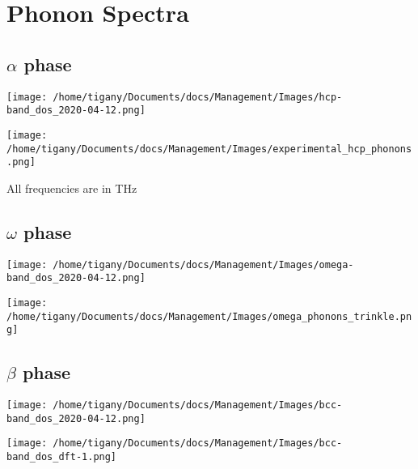 \documentclass[11pt]{article}
\begin{document}
\section*{Phonon Spectra}
\label{sec:org308d6d3}

\subsection*{\(\alpha\) phase}
\label{sec:org92876f7}
\begin{center}
\texttt{[image: /home/tigany/Documents/docs/Management/Images/hcp-band\_dos\_2020-04-12.png]}
\label{orgf3b8320}
\end{center}

\begin{center}
\texttt{[image: /home/tigany/Documents/docs/Management/Images/experimental\_hcp\_phonons.png]}
\end{center}

\begin{notes}
All frequencies are in THz
\end{notes}

\subsection*{\(\omega\) phase}
\label{sec:org385e39c}
\begin{center}
\texttt{[image: /home/tigany/Documents/docs/Management/Images/omega-band\_dos\_2020-04-12.png]}
\label{orgbd29a9a}
\end{center}

\begin{center}
\texttt{[image: /home/tigany/Documents/docs/Management/Images/omega\_phonons\_trinkle.png]}
\end{center}


\subsection*{\(\beta\) phase}
\label{sec:org149761f}
\begin{center}
\texttt{[image: /home/tigany/Documents/docs/Management/Images/bcc-band\_dos\_2020-04-12.png]}
\label{org2e95398}
\end{center}

\begin{center}
\texttt{[image: /home/tigany/Documents/docs/Management/Images/bcc-band\_dos\_dft-1.png]}
\end{center}
\end{document}
